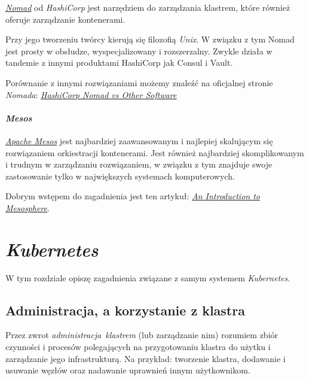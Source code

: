 \documentclass[a4paper,12pt,twoside,openany]{report}
\begin{document}
\href{https://www.nomadproject.io/intro/index.html}{\emph{Nomad}} od
\emph{HashiCorp} jest narzędziem do zarządzania klastrem, które również
oferuje zarządzanie kontenerami.

Przy jego tworzeniu twórcy kierują się filozofią \emph{Unix}. W związku
z tym Nomad jest prosty w obsłudze, wyspecjalizowany i rozszerzalny.
Zwykle działa w tandemie z innymi produktami HashiCorp jak Consul i
Vault.

Porównanie z innymi rozwiązaniami możemy znaleźć na oficjalnej stronie
\emph{Nomada}:
\href{https://www.nomadproject.io/intro/vs/index.html}{\emph{HashiCorp
Nomad vs Other Software}}

\hypertarget{mesos}{%
\subsubsection{\texorpdfstring{\emph{Mesos}}{Mesos}}\label{mesos}}

\href{http://mesos.apache.org/}{\emph{Apache Mesos}} jest najbardziej
zaawansowanym i najlepiej skalującym się rozwiązaniem orkiestracji
kontenerami. Jest również najbardziej skomplikowanym i trudnym w
zarządzaniu rozwiązaniem, w związku z tym znajduje swoje zastosowanie
tylko w największych systemach komputerowych.

Dobrym wstępem do zagadnienia jest ten artykuł:
\href{https://www.digitalocean.com/community/tutorials/an-introduction-to-mesosphere}{\emph{An
Introduction to Mesosphere}}.

\hypertarget{kubernetes-1}{%
\chapter{\texorpdfstring{\emph{Kubernetes}}{Kubernetes}}\label{kubernetes-1}}

W tym rozdziale opiszę zagadnienia związane z samym systemem
\emph{Kubernetes}.

\hypertarget{administracja-a-korzystanie-z-klastra}{%
\section{Administracja, a korzystanie z
klastra}\label{administracja-a-korzystanie-z-klastra}}

Przez zwrot \emph{administracja~klastrem} (lub zarządzanie nim) rozumiem
zbiór czynności i procesów polegających na przygotowaniu klastra do
użytku i zarządzanie jego infrastrukturą. Na przykład: tworzenie
klastra, dodawanie i usuwanie węzłów oraz nadawanie uprawnień innym
użytkownikom.
\end{document}

